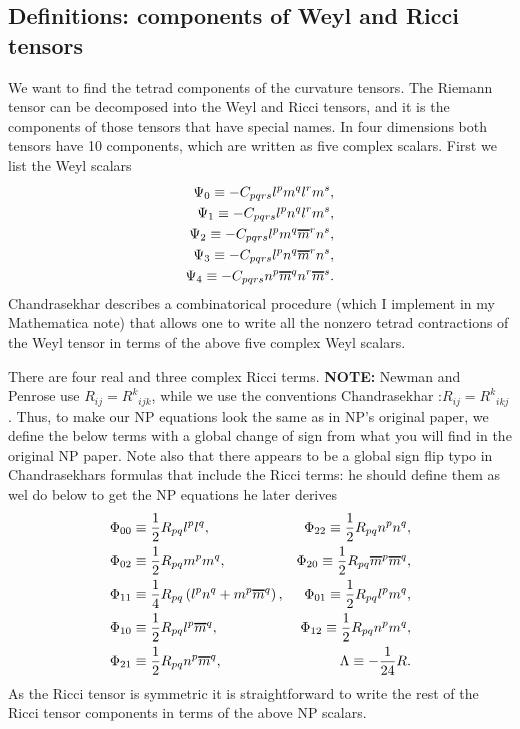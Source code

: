 \documentclass[12pt]{report}
\newcommand*\oline[1]{%
   \vbox{%
     \hrule height 1pt%
     \kern0.25ex%
     \hbox{%
       \ifmmode#1\else\ensuremath{#1}\fi%
     }
   }
}
\begin{document}
\subsection{Definitions: components of Weyl and Ricci tensors}
\label{sec:def_Weyl_Ricci_tensors}
	We want to find the tetrad components of the curvature tensors. The
Riemann tensor can be decomposed into the Weyl and Ricci tensors, and it
is the components of those tensors that have special names. In four dimensions
both tensors have 10 components, which are written as five complex scalars.
First we list the Weyl scalars 
\begin{align}
\begin{aligned}
	\Psi_0
	\equiv
	-C_{pqrs}l^pm^ql^rm^s
	, \\
	\Psi_1
	\equiv
	-C_{pqrs}l^pn^ql^rm^s
	, \\
	\Psi_2
	\equiv
	-C_{pqrs}l^pm^q\oline{m}^rn^s
	, \\
	\Psi_3
	\equiv
	-C_{pqrs}l^pn^q\oline{m}^rn^s
	, \\
	\Psi_4
	\equiv
	-C_{pqrs}n^p\oline{m}^qn^r\oline{m}^s
	.
\end{aligned}
\end{align} 
	Chandrasekhar \cite{Chandrasekhar_bh_book}
describes a combinatorical procedure
(which I implement in my Mathematica note) that allows one to
write all the nonzero tetrad contractions of the Weyl
tensor in terms of the above five complex Weyl scalars.

	There are four real and three complex
Ricci terms. {\bf NOTE:}
Newman and Penrose \cite{Newman_Penrose_paper} use
$R_{ij}=R^k{}_{ijk}$, while we use the conventions Chandrasekhar
\cite{Chandrasekhar_bh_book}:$R_{ij}=R^k{}_{ikj}$.
Thus, to make our NP equations
look the same as in NP's original paper, we define the below
terms with a global change of sign from what you
will find in the original NP paper.
Note also that there appears to be a global
sign flip typo in Chandrasekhars formulas that include the Ricci terms:
he should define them as wel do below to get the NP equations he later
derives
\begin{align}
\begin{aligned} 
	&
	\Phi_{00}
	\equiv
	\frac{1}{2}R_{pq}l^pl^q
	, &
	\Phi_{22}
	\equiv
	\frac{1}{2}R_{pq}n^pn^q
	, \\
	&
	\Phi_{02}
	\equiv
	\frac{1}{2}R_{pq}m^pm^q
	, &
	\Phi_{20}
	\equiv
	\frac{1}{2}R_{pq}\oline{m}^p\oline{m}^q
	, \\
	&
	\Phi_{11}
	\equiv
	\frac{1}{4}R_{pq}\left(
		l^pn^q
	+	m^p\oline{m}^q
	\right)
	, &
	\Phi_{01}
	\equiv
	\frac{1}{2}R_{pq}l^pm^q
	, \\
	&
	\Phi_{10}
	\equiv
	\frac{1}{2}R_{pq}l^p\oline{m}^q
	, &
	\Phi_{12}
	\equiv
	\frac{1}{2}R_{pq}n^pm^q
	, \\
	&
	\Phi_{21}
	\equiv
	\frac{1}{2}R_{pq}n^p\oline{m}^q
	, & 
	\Lambda
	\equiv
	-\frac{1}{24}R
	.
\end{aligned}
\end{align} 
	As the Ricci tensor is symmetric it is straightforward to write
the rest of the Ricci tensor components in terms of the above NP scalars. 
\end{document}
